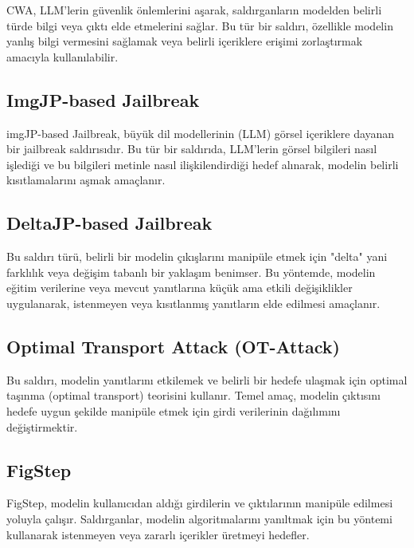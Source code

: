 CWA, LLM'lerin güvenlik önlemlerini aşarak, saldırganların modelden belirli türde bilgi veya çıktı elde etmelerini sağlar. Bu tür bir saldırı, özellikle modelin yanlış bilgi vermesini sağlamak veya belirli içeriklere erişimi zorlaştırmak amacıyla kullanılabilir.

\newpage

\subsection{ImgJP-based Jailbreak}

imgJP-based Jailbreak, büyük dil modellerinin (LLM) görsel içeriklere dayanan bir jailbreak saldırısıdır. Bu tür bir saldırıda, LLM'lerin görsel bilgileri nasıl işlediği ve bu bilgileri metinle nasıl ilişkilendirdiği hedef alınarak, modelin belirli kısıtlamalarını aşmak amaçlanır.

\newpage

\subsection{DeltaJP-based Jailbreak}

Bu saldırı türü, belirli bir modelin çıkışlarını manipüle etmek için "delta" yani farklılık veya değişim tabanlı bir yaklaşım benimser. Bu yöntemde, modelin eğitim verilerine veya mevcut yanıtlarına küçük ama etkili değişiklikler uygulanarak, istenmeyen veya kısıtlanmış yanıtların elde edilmesi amaçlanır.

\newpage

\subsection{Optimal Transport Attack (OT-Attack)}

Bu saldırı, modelin yanıtlarını etkilemek ve belirli bir hedefe ulaşmak için optimal taşınma (optimal transport) teorisini kullanır. Temel amaç, modelin çıktısını hedefe uygun şekilde manipüle etmek için girdi verilerinin dağılımını değiştirmektir.

\newpage

\subsection{FigStep}

FigStep, modelin kullanıcıdan aldığı girdilerin ve çıktılarının manipüle edilmesi yoluyla çalışır. Saldırganlar, modelin algoritmalarını yanıltmak için bu yöntemi kullanarak istenmeyen veya zararlı içerikler üretmeyi hedefler.

